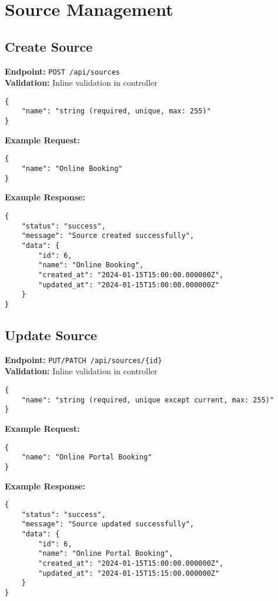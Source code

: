 \documentclass[12pt,a4paper]{article}
\begin{document}
\section{Source Management}

\subsection{Create Source}
\textbf{Endpoint:} \texttt{POST /api/sources}\\
\textbf{Validation:} Inline validation in controller

\begin{lstlisting}[caption=Create Source Request Body]
{
    "name": "string (required, unique, max: 255)"
}
\end{lstlisting}

\textbf{Example Request:}
\begin{lstlisting}[caption=Create Source Example Request]
{
    "name": "Online Booking"
}
\end{lstlisting}

\textbf{Example Response:}
\begin{lstlisting}[caption=Create Source Example Response]
{
    "status": "success",
    "message": "Source created successfully",
    "data": {
        "id": 6,
        "name": "Online Booking",
        "created_at": "2024-01-15T15:00:00.000000Z",
        "updated_at": "2024-01-15T15:00:00.000000Z"
    }
}
\end{lstlisting}

\subsection{Update Source}
\textbf{Endpoint:} \texttt{PUT/PATCH /api/sources/\{id\}}\\
\textbf{Validation:} Inline validation in controller

\begin{lstlisting}[caption=Update Source Request Body]
{
    "name": "string (required, unique except current, max: 255)"
}
\end{lstlisting}

\textbf{Example Request:}
\begin{lstlisting}[caption=Update Source Example Request]
{
    "name": "Online Portal Booking"
}
\end{lstlisting}

\textbf{Example Response:}
\begin{lstlisting}[caption=Update Source Example Response]
{
    "status": "success",
    "message": "Source updated successfully",
    "data": {
        "id": 6,
        "name": "Online Portal Booking",
        "created_at": "2024-01-15T15:00:00.000000Z",
        "updated_at": "2024-01-15T15:15:00.000000Z"
    }
}
\end{lstlisting}
\end{document}
